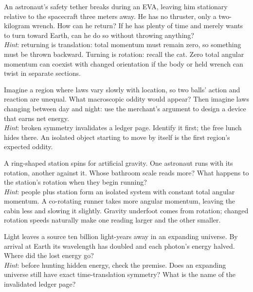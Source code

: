 \begin{puzzles}
\item An astronaut's safety tether breaks during an EVA, leaving him stationary relative to the spacecraft three meters away. He has no thruster, only a two-kilogram wrench. How can he return? If he has plenty of time and merely wants to turn toward Earth, can he do so without throwing anything?\\
\emph{Hint}: returning is translation: total momentum must remain zero, so something must be thrown backward. Turning is rotation: recall the cat. Zero total angular momentum can coexist with changed orientation if the body or held wrench can twist in separate sections.

\item Imagine a region where laws vary slowly with location, so two balls' action and reaction are unequal. What macroscopic oddity would appear? Then imagine laws changing between day and night: use the merchant's argument to design a device that earns net energy.\\
\emph{Hint}: broken symmetry invalidates a ledger page. Identify it first; the free lunch hides there. An isolated object starting to move by itself is the first region's expected oddity.

\item A ring-shaped station spins for artificial gravity. One astronaut runs with its rotation, another against it. Whose bathroom scale reads more? What happens to the station's rotation when they begin running?\\
\emph{Hint}: people plus station form an isolated system with constant total angular momentum. A co-rotating runner takes more angular momentum, leaving the cabin less and slowing it slightly. Gravity underfoot comes from rotation; changed rotation speeds naturally make one reading larger and the other smaller.

\item Light leaves a source ten billion light-years away in an expanding universe. By arrival at Earth its wavelength has doubled and each photon's energy halved. Where did the lost energy go?\\
\emph{Hint}: before hunting hidden energy, check the premise. Does an expanding universe still have exact time-translation symmetry? What is the name of the invalidated ledger page?
\end{puzzles}
